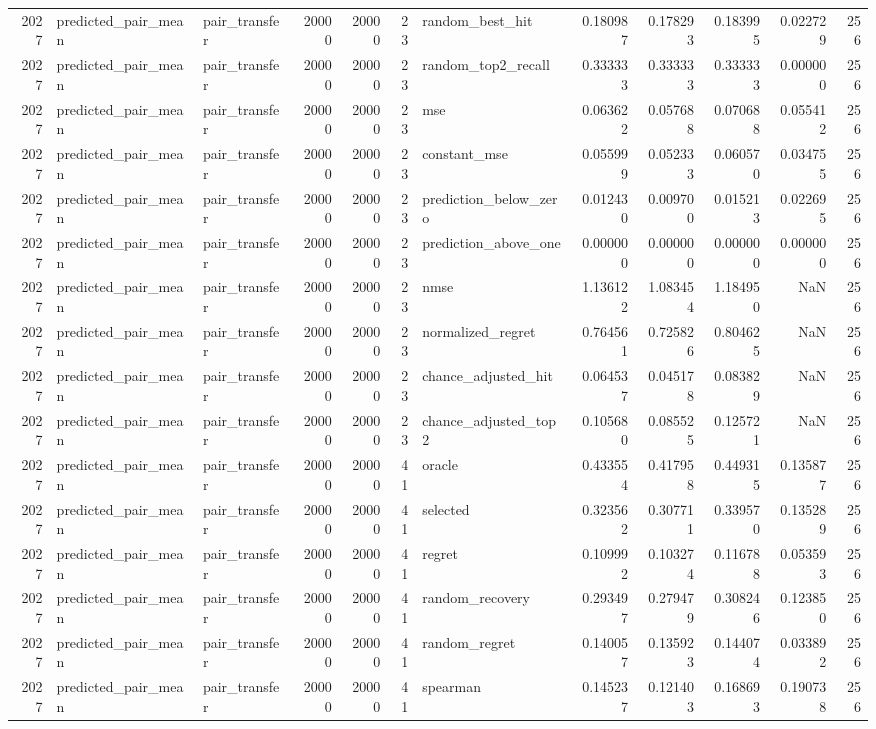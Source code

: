 \begin{tabular}{rllrrrlrrrrr}
2027 & predicted_pair_mean & pair_transfer & 20000 & 20000 & 23 & random_best_hit & 0.180987 & 0.178293 & 0.183995 & 0.022729 & 256 \\
2027 & predicted_pair_mean & pair_transfer & 20000 & 20000 & 23 & random_top2_recall & 0.333333 & 0.333333 & 0.333333 & 0.000000 & 256 \\
2027 & predicted_pair_mean & pair_transfer & 20000 & 20000 & 23 & mse & 0.063622 & 0.057688 & 0.070688 & 0.055412 & 256 \\
2027 & predicted_pair_mean & pair_transfer & 20000 & 20000 & 23 & constant_mse & 0.055999 & 0.052333 & 0.060570 & 0.034755 & 256 \\
2027 & predicted_pair_mean & pair_transfer & 20000 & 20000 & 23 & prediction_below_zero & 0.012430 & 0.009700 & 0.015213 & 0.022695 & 256 \\
2027 & predicted_pair_mean & pair_transfer & 20000 & 20000 & 23 & prediction_above_one & 0.000000 & 0.000000 & 0.000000 & 0.000000 & 256 \\
2027 & predicted_pair_mean & pair_transfer & 20000 & 20000 & 23 & nmse & 1.136122 & 1.083454 & 1.184950 & NaN & 256 \\
2027 & predicted_pair_mean & pair_transfer & 20000 & 20000 & 23 & normalized_regret & 0.764561 & 0.725826 & 0.804625 & NaN & 256 \\
2027 & predicted_pair_mean & pair_transfer & 20000 & 20000 & 23 & chance_adjusted_hit & 0.064537 & 0.045178 & 0.083829 & NaN & 256 \\
2027 & predicted_pair_mean & pair_transfer & 20000 & 20000 & 23 & chance_adjusted_top2 & 0.105680 & 0.085525 & 0.125721 & NaN & 256 \\
2027 & predicted_pair_mean & pair_transfer & 20000 & 20000 & 41 & oracle & 0.433554 & 0.417958 & 0.449315 & 0.135877 & 256 \\
2027 & predicted_pair_mean & pair_transfer & 20000 & 20000 & 41 & selected & 0.323562 & 0.307711 & 0.339570 & 0.135289 & 256 \\
2027 & predicted_pair_mean & pair_transfer & 20000 & 20000 & 41 & regret & 0.109992 & 0.103274 & 0.116788 & 0.053593 & 256 \\
2027 & predicted_pair_mean & pair_transfer & 20000 & 20000 & 41 & random_recovery & 0.293497 & 0.279479 & 0.308246 & 0.123850 & 256 \\
2027 & predicted_pair_mean & pair_transfer & 20000 & 20000 & 41 & random_regret & 0.140057 & 0.135923 & 0.144074 & 0.033892 & 256 \\
2027 & predicted_pair_mean & pair_transfer & 20000 & 20000 & 41 & spearman & 0.145237 & 0.121403 & 0.168693 & 0.190738 & 256 \\

\end{tabular}
